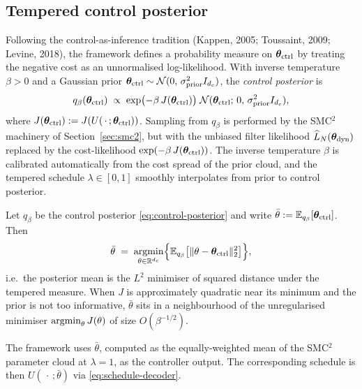\subsection{Tempered control posterior}

Following the control-as-inference tradition (Kappen, 2005;
Toussaint, 2009; Levine, 2018), the framework defines a probability
measure on $\bm{\theta}_{\rm ctrl}$ by treating the negative cost as an
unnormalised log-likelihood. With inverse temperature $\beta > 0$ and
a Gaussian prior
$\bm{\theta}_{\rm ctrl} \sim \mathcal{N}(0,\, \sigma_{\rm prior}^2 I_{d_c})$, the
\emph{control posterior} is
\begin{equation}
q_\beta(\bm{\theta}_{\rm ctrl}) \;\propto\;
   \exp\bigl(-\beta\,J(\bm{\theta}_{\rm ctrl})\bigr)\;
   \mathcal{N}(\bm{\theta}_{\rm ctrl};\,0,\,\sigma_{\rm prior}^2 I_{d_c}),
\label{eq:control-posterior}
\end{equation}
where $J(\bm{\theta}_{\rm ctrl}) := J(U(\,\cdot\,; \bm{\theta}_{\rm ctrl}))$. Sampling from
$q_\beta$ is performed by the SMC$^2$ machinery of
Section~\ref{sec:smc2}, but with the unbiased filter likelihood
$\widehat{L}_N(\bm{\theta}_{\rm dyn})$ replaced by the cost-likelihood
$\exp(-\beta\,J(\bm{\theta}_{\rm ctrl}))$. The inverse temperature $\beta$ is
calibrated automatically from the cost spread of the prior cloud, and
the tempered schedule $\lambda \in [0, 1]$ smoothly interpolates from
prior to control posterior.

\begin{proposition}
\label{prop:control-mean}
Let $q_\beta$ be the control posterior \eqref{eq:control-posterior}
and write $\bar\theta := \mathbb{E}_{q_\beta}[\bm{\theta}_{\rm ctrl}]$. Then
\begin{equation}
\bar\theta \;=\;
   \operatorname*{argmin}_{\theta \in \mathbb{R}^{d_c}}
   \Bigl\{\mathbb{E}_{q_\beta}\bigl[\|\theta - \bm{\theta}_{\rm ctrl}\|_2^2\bigr]\Bigr\},
\label{eq:posterior-mean-l2}
\end{equation}
i.e.\ the posterior mean is the $L^2$ minimiser of squared distance
under the tempered measure. When $J$ is approximately quadratic near
its minimum and the prior is not too informative, $\bar\theta$ sits
in a neighbourhood of the unregularised minimiser
$\operatorname*{argmin}_\theta J(\theta)$ of size $O(\beta^{-1/2})$.
\end{proposition}

The framework uses $\bar\theta$, computed as the equally-weighted mean
of the SMC$^2$ parameter cloud at $\lambda = 1$, as the controller
output. The corresponding schedule is then
$U(\,\cdot\,; \bar\theta)$ via \eqref{eq:schedule-decoder}.

